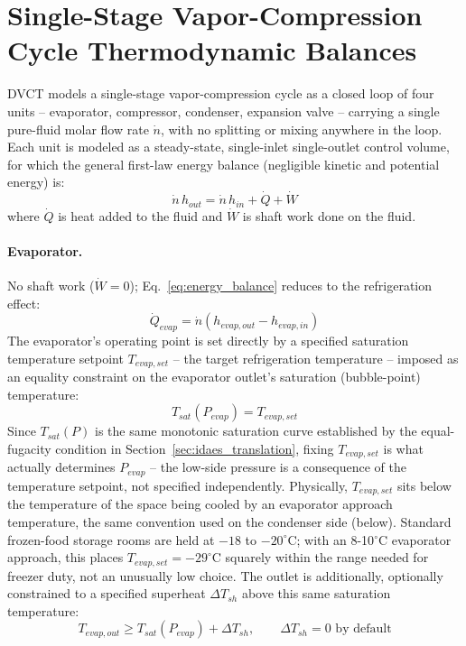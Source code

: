 \documentclass{article}
\begin{document}
\section{Single-Stage Vapor-Compression Cycle Thermodynamic Balances}\label{sec:cycle_balances}
DVCT models a single-stage vapor-compression cycle as a closed loop of four
units -- evaporator, compressor, condenser, expansion valve -- carrying a
single pure-fluid molar flow rate $\dot n$, with no splitting or mixing
anywhere in the loop. Each unit is modeled as a steady-state, single-inlet
single-outlet control volume, for which the general first-law energy
balance (negligible kinetic and potential energy) is:
\begin{equation}\label{eq:energy_balance}
    \dot n\, h_{out} = \dot n\, h_{in} + \dot Q + \dot W
\end{equation}
where $\dot Q$ is heat added to the fluid and $\dot W$ is shaft work done
on the fluid.

\paragraph{Evaporator.} No shaft work ($\dot W=0$); Eq.~\eqref{eq:energy_balance}
reduces to the refrigeration effect:
\begin{equation}\label{eq:q_evap}
    \dot Q_{evap} = \dot n\left(h_{evap,out} - h_{evap,in}\right)
\end{equation}
The evaporator's operating point is set directly by a specified saturation
temperature setpoint $T_{evap,set}$ -- the target refrigeration
temperature -- imposed as an equality constraint on the evaporator
outlet's saturation (bubble-point) temperature:
\begin{equation}\label{eq:evap_setpoint}
    T_{sat}(P_{evap}) = T_{evap,set}
\end{equation}
Since $T_{sat}(P)$ is the same monotonic saturation curve established by
the equal-fugacity condition in Section~\ref{sec:idaes_translation}, fixing
$T_{evap,set}$ is what actually determines $P_{evap}$ -- the low-side
pressure is a consequence of the temperature setpoint, not specified
independently. Physically, $T_{evap,set}$ sits below the temperature of
the space being cooled by an evaporator approach temperature, the same
convention used on the condenser side (below). Standard frozen-food
storage rooms are held at $-18$ to $-20^\circ$C; with an 8-10$^\circ$C
evaporator approach, this places $T_{evap,set}=-29^\circ$C squarely
within the range needed for freezer duty, not an unusually low choice.
The outlet is additionally, optionally constrained to a specified
superheat $\Delta T_{sh}$ above this same saturation temperature:
\begin{equation}\label{eq:superheat}
    T_{evap,out} \ge T_{sat}(P_{evap}) + \Delta T_{sh}, \qquad \Delta T_{sh}=0 \text{ by default}
\end{equation}
\end{document}

